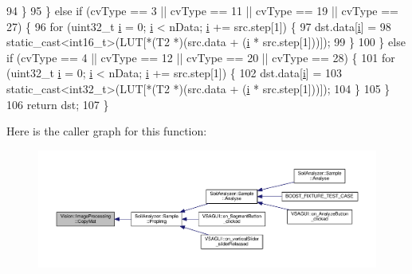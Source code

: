 \begin{DoxyCode}
94       \}
95     \} \textcolor{keywordflow}{else} \textcolor{keywordflow}{if} (cvType == 3 || cvType == 11 || cvType == 19 || cvType == 27) \{
96       \textcolor{keywordflow}{for} (uint32\_t \hyperlink{_comparision_pictures_2_createtest_image_8m_a6f6ccfcf58b31cb6412107d9d5281426}{i} = 0; \hyperlink{_comparision_pictures_2_createtest_image_8m_a6f6ccfcf58b31cb6412107d9d5281426}{i} < nData; \hyperlink{_comparision_pictures_2_createtest_image_8m_a6f6ccfcf58b31cb6412107d9d5281426}{i} += src.step[1]) \{
97         dst.data[\hyperlink{_comparision_pictures_2_createtest_image_8m_a6f6ccfcf58b31cb6412107d9d5281426}{i}] =
98             \textcolor{keyword}{static\_cast<}int16\_t\textcolor{keyword}{>}(LUT[*(T2 *)(src.data + (\hyperlink{_comparision_pictures_2_createtest_image_8m_a6f6ccfcf58b31cb6412107d9d5281426}{i} * src.step[1]))]);
99       \}
100     \} \textcolor{keywordflow}{else} \textcolor{keywordflow}{if} (cvType == 4 || cvType == 12 || cvType == 20 || cvType == 28) \{
101       \textcolor{keywordflow}{for} (uint32\_t \hyperlink{_comparision_pictures_2_createtest_image_8m_a6f6ccfcf58b31cb6412107d9d5281426}{i} = 0; \hyperlink{_comparision_pictures_2_createtest_image_8m_a6f6ccfcf58b31cb6412107d9d5281426}{i} < nData; \hyperlink{_comparision_pictures_2_createtest_image_8m_a6f6ccfcf58b31cb6412107d9d5281426}{i} += src.step[1]) \{
102         dst.data[\hyperlink{_comparision_pictures_2_createtest_image_8m_a6f6ccfcf58b31cb6412107d9d5281426}{i}] =
103             \textcolor{keyword}{static\_cast<}int32\_t\textcolor{keyword}{>}(LUT[*(T2 *)(src.data + (\hyperlink{_comparision_pictures_2_createtest_image_8m_a6f6ccfcf58b31cb6412107d9d5281426}{i} * src.step[1]))]);
104       \}
105     \}
106     \textcolor{keywordflow}{return} dst;
107   \}
\end{DoxyCode}


Here is the caller graph for this function\+:\nopagebreak
\begin{figure}[H]
\begin{center}
\leavevmode
\includegraphics[width=350pt]{class_vision_1_1_image_processing_a16f96c26c7c5c6feb7ac103b9b478682_icgraph}
\end{center}
\end{figure}


